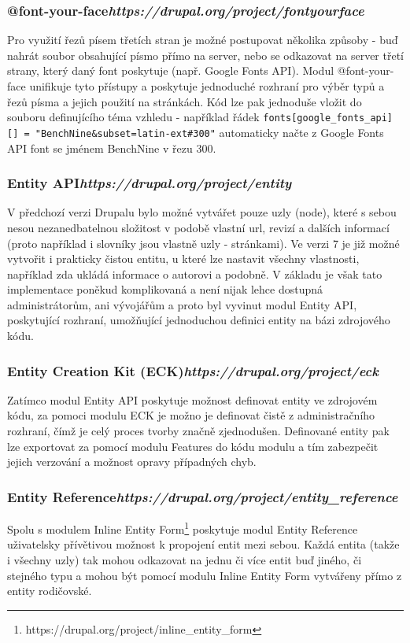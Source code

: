 \subsubsection*{@font-your-face\hfill \emph{https://drupal.org/project/fontyourface}} 
Pro využití řezů písem třetích stran je možné postupovat několika způsoby - buď nahrát soubor obsahující písmo přímo na server, nebo se odkazovat na server třetí strany, který daný font poskytuje (např. Google Fonts API). Modul @font-your-face unifikuje tyto přístupy a poskytuje jednoduché rozhraní pro výběr typů a řezů písma a jejich použití na stránkách. Kód lze pak jednoduše vložit do souboru definujícího téma vzhledu - například řádek \texttt{fonts[google\_fonts\_api][] = "BenchNine\&subset=latin-ext\#300"} automaticky načte z Google Fonts API font se jménem BenchNine v řezu 300.

\subsubsection*{Entity API\hfill \emph{https://drupal.org/project/entity}}
V předchozí verzi Drupalu bylo možné vytvářet pouze uzly (node), které s sebou nesou nezanedbatelnou složitost v podobě vlastní \gls{url}, revizí a dalších informací (proto například i slovníky jsou vlastně uzly - stránkami). Ve verzi 7 je již možné vytvořit i prakticky čistou entitu, u které lze nastavit všechny vlastnosti, například zda ukládá informace o autorovi a podobně. V základu je však tato implementace poněkud komplikovaná a není nijak lehce dostupná administrátorům, ani vývojářům a proto byl vyvinut modul Entity API, poskytující rozhraní, umožňující jednoduchou definici entity na bázi zdrojového kódu. 

\subsubsection*{Entity Creation Kit (ECK)\hfill \emph{https://drupal.org/project/eck}} 
Zatímco modul Entity API poskytuje možnost definovat entity ve zdrojovém kódu, za pomoci modulu ECK je možno je definovat čistě z administračního rozhraní, čímž je celý proces tvorby značně zjednodušen. Definované entity pak lze exportovat za pomocí modulu Features do kódu modulu a tím zabezpečit jejich verzování a možnost opravy případných chyb.

\subsubsection*{Entity Reference\hfill \emph{https://drupal.org/project/entity\_reference}}
Spolu s modulem Inline Entity Form\footnote{https://drupal.org/project/inline\_entity\_form} poskytuje modul Entity Reference uživatelsky přívětivou možnost k propojení entit mezi sebou. Každá entita (takže i všechny uzly) tak mohou odkazovat na jednu či více entit buď jiného, či stejného typu a mohou být pomocí modulu Inline Entity Form vytvářeny přímo z entity rodičovské. 

